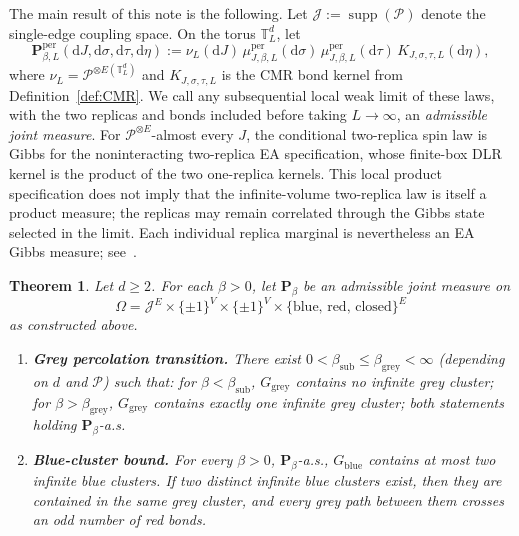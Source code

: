 \documentclass[11pt]{article}
\newtheorem{theorem}{Theorem}
\numberwithin{theorem}{section}
\theoremstyle{remark}
\begin{document}
The main result of this note is the following.
Let $\mathcal{J} := \operatorname{supp}(\mathscr{P})$ denote the single-edge coupling space.
On the torus $\mathbb{T}_L^d$, let
\begin{equation}\label{eq:torus-joint-law}
  \mathbf{P}_{\beta,L}^{\mathrm{per}}(\mathrm{d}J,\mathrm{d}\sigma,\mathrm{d}\tau,\mathrm{d}\eta)
  := \nu_L(\mathrm{d}J)\,
     \mu_{J,\beta,L}^{\mathrm{per}}(\mathrm{d}\sigma)\,
     \mu_{J,\beta,L}^{\mathrm{per}}(\mathrm{d}\tau)\,
     K_{J,\sigma,\tau,L}(\mathrm{d}\eta),
\end{equation}
where $\nu_L=\mathscr{P}^{\otimes E(\mathbb{T}_L^d)}$ and $K_{J,\sigma,\tau,L}$ is the CMR bond kernel from Definition~\ref{def:CMR}.
We call any subsequential local weak limit of these laws, with the two replicas and bonds included before taking $L\to\infty$, an \emph{admissible joint measure}.
For $\mathscr{P}^{\otimes E}$-almost every $J$, the conditional two-replica spin law is Gibbs for the noninteracting two-replica EA specification, whose finite-box DLR kernel is the product of the two one-replica kernels.
This local product specification does not imply that the infinite-volume two-replica law is itself a product measure; the replicas may remain correlated through the Gibbs state selected in the limit.
Each individual replica marginal is nevertheless an EA Gibbs measure; see~\cite[Proposition~4.12, Remark~4.13, and Lemma~B.4]{Newman1997}.

\begin{theorem}\label{thm:main}
Let $d \geq 2$. For each $\beta > 0$, let $\mathbf{P}_\beta$ be an admissible joint measure on
\[
  \Omega = \mathcal{J}^E \times \{\pm 1\}^V \times \{\pm 1\}^V \times \{\text{blue, red, closed}\}^E
\]
as constructed above.
\begin{enumerate}
\item[\textup{(a)}] \textbf{Grey percolation transition.}
  There exist $0 < \beta_{\mathrm{sub}} \leq \beta_{\mathrm{grey}} < \infty$ (depending on $d$ and $\mathscr{P}$) such that:
  for $\beta < \beta_{\mathrm{sub}}$, $G_{\mathrm{grey}}$ contains no infinite grey cluster;
  for $\beta > \beta_{\mathrm{grey}}$, $G_{\mathrm{grey}}$ contains exactly one infinite grey cluster;
  both statements holding $\mathbf{P}_\beta$-a.s.
\item[\textup{(b)}] \textbf{Blue-cluster bound.}
  For every $\beta > 0$, $\mathbf{P}_\beta$-a.s., $G_{\mathrm{blue}}$ contains at most two infinite blue clusters.
  If two distinct infinite blue clusters exist, then they are contained in the same grey cluster, and every grey path between them crosses an odd number of red bonds.
\end{enumerate}
\end{theorem}
\end{document}
